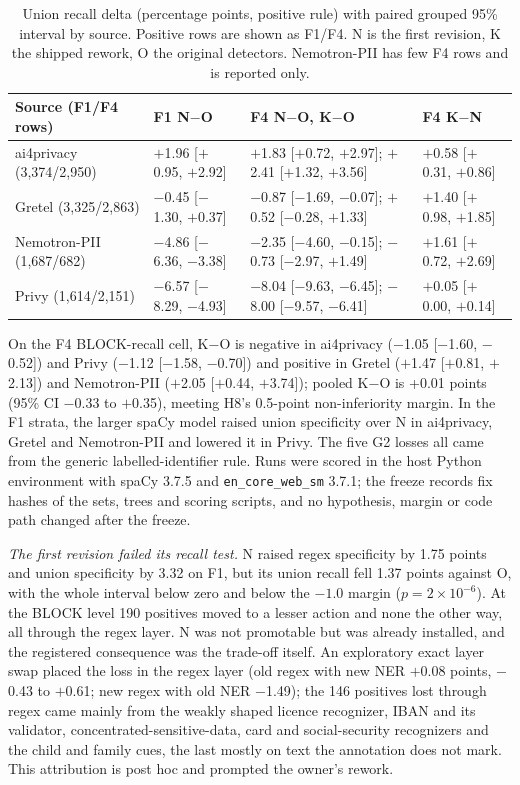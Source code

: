 \documentclass[sigconf]{acmart}
\theoremstyle{acmdefinition}\newtheorem{property}{Property}
\begin{document}
\begin{table}[!t]
\centering
\caption{Union recall delta (percentage points, positive rule) with paired grouped 95\% interval by source. Positive rows are shown as F1/F4. N is the first revision, K the shipped rework, O the original detectors. Nemotron-PII has few F4 rows and is reported only.}
\label{tab:heldout_source}
\small
\setlength{\tabcolsep}{4pt}
\begin{tabular}{llll}
\toprule
Source (F1/F4 rows) & F1 N$-$O & F4 N$-$O, K$-$O & F4 K$-$N \\
\midrule
ai4privacy (3,374/2,950) & $+$1.96 [$+$0.95, $+$2.92] & $+$1.83 [$+$0.72, $+$2.97]; $+$2.41 [$+$1.32, $+$3.56] & $+$0.58 [$+$0.31, $+$0.86] \\
Gretel (3,325/2,863) & $-$0.45 [$-$1.30, $+$0.37] & $-$0.87 [$-$1.69, $-$0.07]; $+$0.52 [$-$0.28, $+$1.33] & $+$1.40 [$+$0.98, $+$1.85] \\
Nemotron-PII (1,687/682) & $-$4.86 [$-$6.36, $-$3.38] & $-$2.35 [$-$4.60, $-$0.15]; $-$0.73 [$-$2.97, $+$1.49] & $+$1.61 [$+$0.72, $+$2.69] \\
Privy (1,614/2,151) & $-$6.57 [$-$8.29, $-$4.93] & $-$8.04 [$-$9.63, $-$6.45]; $-$8.00 [$-$9.57, $-$6.41] & $+$0.05 [$+$0.00, $+$0.14] \\
\bottomrule
\end{tabular}
\end{table}

On the F4 BLOCK-recall cell, K$-$O is negative in ai4privacy ($-$1.05 [$-$1.60, $-$0.52]) and Privy ($-$1.12 [$-$1.58, $-$0.70]) and positive in Gretel ($+$1.47 [$+$0.81, $+$2.13]) and Nemotron-PII ($+$2.05 [$+$0.44, $+$3.74]); pooled K$-$O is +0.01 points (95\% CI $-$0.33 to $+$0.35), meeting H8's 0.5-point non-inferiority margin. In the F1 strata, the larger spaCy model raised union specificity over N in ai4privacy, Gretel and Nemotron-PII and lowered it in Privy. The five G2 losses all came from the generic labelled-identifier rule. Runs were scored in the host Python environment with spaCy 3.7.5 and \texttt{en\_core\_web\_sm} 3.7.1; the freeze records fix hashes of the sets, trees and scoring scripts, and no hypothesis, margin or code path changed after the freeze.

\textit{The first revision failed its recall test.} N raised regex specificity by 1.75 points and union specificity by 3.32 on F1, but its union recall fell 1.37 points against O, with the whole interval below zero and below the $-1.0$ margin ($p=2\times10^{-6}$). At the BLOCK level 190 positives moved to a lesser action and none the other way, all through the regex layer. N was not promotable but was already installed, and the registered consequence was the trade-off itself. An exploratory exact layer swap placed the loss in the regex layer (old regex with new NER $+$0.08 points, $-$0.43 to $+$0.61; new regex with old NER $-$1.49); the 146 positives lost through regex came mainly from the weakly shaped licence recognizer, IBAN and its validator, concentrated-sensitive-data, card and social-security recognizers and the child and family cues, the last mostly on text the annotation does not mark. This attribution is post hoc and prompted the owner's rework.
\end{document}
